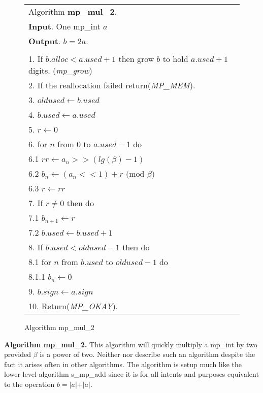 \documentclass[b5paper]{book}
\begin{document}
\newpage\begin{figure}[!here]
\begin{small}
\begin{center}
\begin{tabular}{l}
\hline Algorithm \textbf{mp\_mul\_2}. \\
\textbf{Input}.   One mp\_int $a$ \\
\textbf{Output}.  $b = 2a$. \\
\hline \\
1.  If $b.alloc < a.used + 1$ then grow $b$ to hold $a.used + 1$ digits.  (\textit{mp\_grow}) \\
2.  If the reallocation failed return(\textit{MP\_MEM}). \\
3.  $oldused \leftarrow b.used$ \\
4.  $b.used \leftarrow a.used$ \\
5.  $r \leftarrow 0$ \\
6.  for $n$ from 0 to $a.used - 1$ do \\
\hspace{3mm}6.1  $rr \leftarrow a_n >> (lg(\beta) - 1)$ \\
\hspace{3mm}6.2  $b_n \leftarrow (a_n << 1) + r \mbox{ (mod }\beta\mbox{)}$ \\
\hspace{3mm}6.3  $r \leftarrow rr$ \\
7.  If $r \ne 0$ then do \\
\hspace{3mm}7.1  $b_{n + 1} \leftarrow r$ \\
\hspace{3mm}7.2  $b.used \leftarrow b.used + 1$ \\
8.  If $b.used < oldused - 1$ then do \\
\hspace{3mm}8.1  for $n$ from $b.used$ to $oldused - 1$ do \\
\hspace{6mm}8.1.1  $b_n \leftarrow 0$ \\
9.  $b.sign \leftarrow a.sign$ \\
10.  Return(\textit{MP\_OKAY}).\\
\hline
\end{tabular}
\end{center}
\end{small}
\caption{Algorithm mp\_mul\_2}
\end{figure}

\textbf{Algorithm mp\_mul\_2.}
This algorithm will quickly multiply a mp\_int by two provided $\beta$ is a power of two.  Neither \cite{TAOCPV2} nor \cite{HAC} describe such 
an algorithm despite the fact it arises often in other algorithms.  The algorithm is setup much like the lower level algorithm s\_mp\_add since 
it is for all intents and purposes equivalent to the operation $b = \vert a \vert + \vert a \vert$.  
\end{document}

